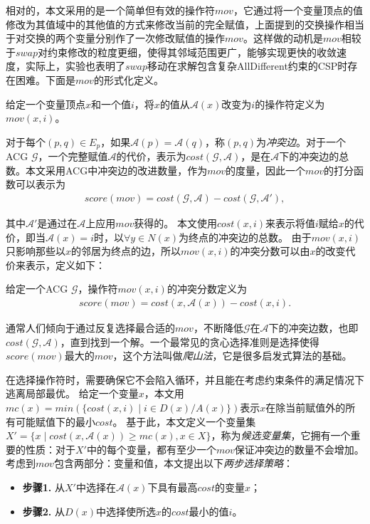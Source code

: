 相对的，本文采用的是一个简单但有效的操作符$mov$，它通过将一个变量顶点的值修改为其值域中的其他值的方式来修改当前的完全赋值，上面提到的交换操作相当于对交换的两个变量分别作了一次修改赋值的操作$mov$。这样做的动机是$mov$相较于$swap$对约束修改的粒度更细，使得其邻域范围更广，能够实现更快的收敛速度，实际上，实验也表明了$swap$移动在求解包含复杂AllDifferent约束的CSP时存在困难。下面是$mov$的形式化定义。

\begin{definition}
给定一个变量顶点$x$和一个值$i$，将$x$的值从$\mathcal{A}(x)$改变为$i$的操作符定义为$mov(x, i)$。
\end{definition}

对于每个$(p,q) \in E_p$，如果$\mathcal{A}(p) = \mathcal{A}(q)$，称$(p,q)$为{\it 冲突边}。对于一个ACG $\mathcal{G}$，一个完整赋值$\mathcal{A}$的代价，表示为$cost(\mathcal{G},\mathcal{A})$，是在$\mathcal{A}$下的冲突边的总数。本文采用ACG中冲突边的改进数量，作为$mov$的度量，因此一个$mov$的打分函数可以表示为%
\begin{align}
    score(mov) = cost(\mathcal{G}, \mathcal{A}) - cost(\mathcal{G}, \mathcal{A}'),
\end{align}%

其中$\mathcal{A}'$是通过在$\mathcal{A}$上应用$mov$获得的。
本文使用$cost(x, i)$来表示将值$i$赋给$x$的代价，即当$\mathcal{A}(x) = i$时，以$\forall y \in N(x)$为终点的冲突边的总数。
由于$mov(x, i)$只影响那些以$x$的邻居为终点的边，所以$mov(x, i)$的冲突分数可以由$x$的改变代价来表示，定义如下：

\begin{definition}
给定一个ACG $\mathcal{G}$，操作符$mov(x, i)$的冲突分数定义为
\begin{align}
    score(mov) = cost(x, \mathcal{A}(x)) - cost(x, i).
\end{align}%
\end{definition}

通常人们倾向于通过反复选择最合适的$mov$，不断降低$\mathcal{G}$在$\mathcal{A}$下的冲突边数，也即$cost(\mathcal{G}, \mathcal{A})$，直到找到一个解。一个最常见的贪心选择准则是选择使得$score(mov)$最大的$mov$，这个方法叫做\textit{爬山法}，它是很多启发式算法的基础。

在选择操作符时，需要确保它不会陷入循环，并且能在考虑约束条件的满足情况下逃离局部最优。
给定一个变量$x$，本文用$mc(x)=min(\{ cost(x, i) \mid i \in D(x)/A(x) \})$表示$x$在除当前赋值外的所有可能赋值下的最小$cost$。
基于此，本文定义一个变量集$X'=\{ x \mid cost(x, \mathcal{A}(x)) \geq mc(x), x \in X \}$，称为\textit{候选变量集}，它拥有一个重要的性质：对于$X'$中的每个变量，都有至少一个$mov$保证冲突边的数量不会增加。
考虑到$mov$包含两部分：变量和值，本文提出以下\textit{两步选择策略}：
\begin{itemize}
    \item \textbf{步骤1.} 从$X'$中选择在$\mathcal{A}(x)$下具有最高$cost$的变量$x$；
    \item \textbf{步骤2.} 从$D(x)$中选择使所选$x$的$cost$最小的值$i$。
\end{itemize}

